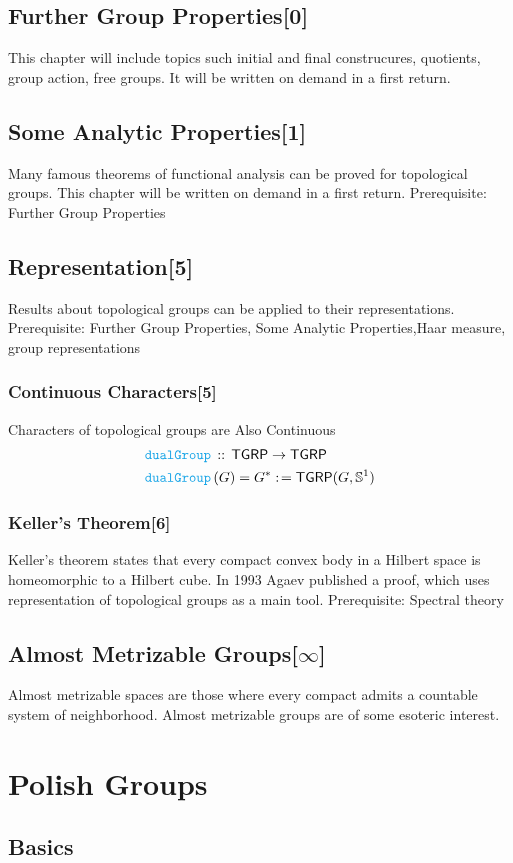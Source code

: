 \documentclass[12pt]{scrartcl}
\newcommand{\FUNC}[1]{\textcolor{Cerulean}{\mathtt{#1}}}
\renewcommand{\.}{\; . \;}
\newcommand{\de}{: \kern 0.1pc =}
\newcommand{\Act}[1]{\left( #1 \right)}
\newcommand{\DeclareFunc}[2]{& \FUNC{#1} \, :: \, #2 \\}
\newcommand{\DefineNamedFunc}[4]{&  \FUNC{#1}\Act{#2} = #3 \de #4 \\}
\newcommand{\Page}[1]{ \begin{align*} #1 \end{align*}   }
\newcommand{\Sphere}{\mathbb{S}}
\newcommand{\TGRP}{\mathsf{TGRP}}
\begin{document}
\subsection{Further Group Properties[0]} 
This chapter will include topics such 
initial and final construcures,
quotients, 
group action,
free groups.
It will be written on demand in a first return.
\subsection{Some Analytic Properties[1]}
Many famous theorems of functional analysis can be proved for topological groups.
This chapter will be written on demand in a first return.
Prerequisite: Further Group Properties
\newpage
\subsection{Representation[5]}
Results about topological groups can be applied to their representations.
Prerequisite: Further Group Properties, Some Analytic Properties,Haar measure, group representations
\subsubsection{Continuous Characters[5]}
Characters of topological groups are Also Continuous
\Page{
	\DeclareFunc{dualGroup}{\TGRP \to \TGRP}
	\DefineNamedFunc{dualGroup}{G}{G^*}{\TGRP(G,\Sphere^1)}
}
\newpage
\subsubsection{Keller's Theorem[6]}
Keller's theorem states that every compact convex body 
in a Hilbert space is homeomorphic to a Hilbert cube.
In 1993 Agaev published a proof, which uses representation of topological groups as a main tool. Prerequisite: Spectral theory
\subsection{Almost Metrizable Groups[$\infty$]}
Almost metrizable spaces are those where every compact admits a countable system of neighborhood. Almost metrizable groups are of some esoteric interest. 
\newpage
\section{Polish Groups}
\subsection{Basics}
\end{document}
